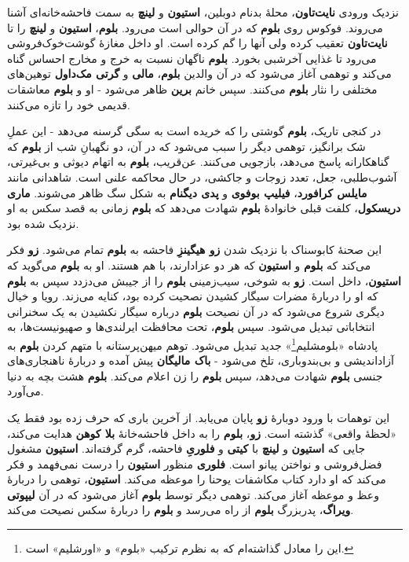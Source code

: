 \documentclass[12pt]{book}
\newcommand{\noun}[1]{{\textbf{#1}}}
\begin{document}
    نزدیک ورودی \noun{نایت‌تاون}، محلهٔ بدنام دوبلین، \noun{استیون} و \noun{لینچ} به سمت فاحشه‌خانه‌ای آشنا می‌روند. فوکوس روی \noun{بلوم} که در آن حوالی است می‌رود. \noun{بلوم}، \noun{استیون} و \noun{لینچ} را تا \noun{نایت‌تاون} تعقیب کرده ولی آنها را گم کرده است. او داخل مغازهٔ گوشت‌خوک‌فروشی می‌رود تا غذایی آخرشبی بخورد. \noun{بلوم} ناگهان نسبت به خرج و مخارج احساس گناه می‌کند و توهمی آغاز می‌شود که در آن والدین \noun{بلوم}، \noun{مالی} و \noun{گرتی مک‌داول‬} توهین‌های مختلفی را نثار \noun{بلوم} می‌کنند. سپس خانم \noun{برین} ظاهر می‌شود - او و \noun{بلوم} معاشقات قدیمی خود را تازه می‌کنند.

    در کنجی تاریک، \noun{بلوم} گوشتی را که خریده است به سگی گرسنه می‌دهد - این عملِ شک برانگیز، توهمی دیگر را سبب می‌شود که در آن، دو نگهبانِ شب از \noun{بلوم} که گناهکارانه پاسخ می‌دهد، بازجویی می‌کنند. عن‌قریب، \noun{بلوم} به اتهام دیوثی و بی‌غیرتی، آشوب‌طلبی، جعل، تعدد زوجات و جاکشی، در حال محاکمه علنی است. شاهدانی مانند \noun{مایلس کرافورد}، \noun{فیلیپ بوفوی} و \noun{پدی دیگنام} به شکل سگ ظاهر می‌شوند. \noun{ماری دریسکول}، کلفت قبلی خانوادهٔ \noun{بلوم} شهادت می‌دهد که \noun{بلوم} زمانی به قصد سکس به او نزدیک شده بود.

    این صحنهٔ کابوسناک با نزدیک شدن \noun{زو هیگینزِ} فاحشه به \noun{بلوم} تمام می‌شود. \noun{زو} فکر می‌کند که \noun{بلوم} و \noun{استیون} که هر دو عزادارند، با هم هستند. او به \noun{بلوم} می‌گوید که \noun{استیون}، داخل است. \noun{زو} به شوخی، سیب‌زمینی \noun{بلوم} را از جیبش می‌دزدد سپس به \noun{بلوم} که او را دربارهٔ مضرات سیگار کشیدن نصحیت کرده بود، کنایه می‌زند. رویا و خیال دیگری شروع می‌شود که در آن نصیحت \noun{بلوم} درباره سیگار نکشیدن به یک سخنرانی انتخاباتی تبدیل می‌شود. سپس \noun{بلوم}، تحت محافظت ایرلندی‌ها و صهیونیست‌ها، به پادشاه «بلومشلیم\footnote{این را معادل  گذاشته‌ام که به نظرم ترکیب «بلوم»  و «اورشلیم»  است.}» جدید تبدیل می‌شود. توهم میهن‌پرستانه با متهم کردن \noun{بلوم} به آزاداندیشی و بی‌بندوباری، تلخ می‌شود - \noun{باک مالیگان‬} پیش آمده و دربارهٔ ناهنجاری‌های جنسی \noun{بلوم} شهادت می‌دهد، سپس \noun{بلوم} را زن اعلام می‌کند. \noun{بلوم} هشت بچه به دنیا می‌آورد.

    این توهمات با ورود دوبارهٔ \noun{زو} پایان می‌یابد. از آخرین باری که حرف زده بود فقط یک «لحظهٔ واقعی» گذشته است. \noun{زو}، \noun{بلوم} را به داخل فاحشه‌خانهٔ \noun{بلا کوهن} هدایت می‌کند، جایی که \noun{استیون} و \noun{لینچ} با \noun{کیتی} و \noun{فلوریِ} فاحشه، گرم گرفته‌اند. \noun{استیون} مشغول فضل‌فروشی و نواختن پیانو است. \noun{فلوری} منظور \noun{استیون} را درست نمی‌فهمد و فکر می‌کند که او دارد کتاب مکاشفات یوحنا را موعظه می‌کند. \noun{استیون}، توهمی را دربارهٔ وعظ و موعظه آغاز می‌کند. توهمی دیگر توسط \noun{بلوم} آغاز می‌شود که در آن \noun{لیپوتی ویراگ}، پدربزرگ \noun{بلوم} از راه می‌رسد و \noun{بلوم} را دربارهٔ سکس نصیحت می‌کند.
\end{document}
